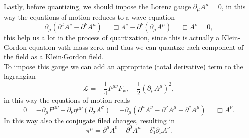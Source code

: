 Lastly, before quantizing, we should impose the Lorenz gauge $\partial_\mu A^\mu=0$, in this way the equations of motion reduces to a wave equation 
\begin{equation*}
    \partial_\mu(\partial^\mu A^\nu-\partial^\nu A^\mu)=\Box A^\nu-\partial^\nu(\partial_\mu A^\mu)=\Box A^\nu=0,
\end{equation*}
this help us a lot in the process of quantization, since this is actually a Klein-Gordon equation with mass zero, and thus we can quantize each component of the field as a Klein-Gordon field.\\
To impose this gauge we can add an appropriate (total derivative) term to the lagrangian
\begin{equation*}
    \mathcal{L}=-\frac{1}{4}F^{\mu\nu}F_{\mu\nu}-\frac{1}{2}(\partial_\mu A^\mu)^2,
\end{equation*} 
in this way the equations of motion reads\begin{equation*}
    0=-\partial_\mu F^{\mu\nu}-\partial_\nu\eta^{\mu\nu}(\partial_\sigma A^\sigma)=-\partial_\mu(\partial^\mu A^\nu-\partial^\nu A^\mu+\partial^\nu A^\mu)=\Box A^\nu.
\end{equation*}
In this way also the conjugate filed changes, resulting in
\begin{equation*}
    \pi^{\mu}=\partial^\mu A^0-\partial^0 A^\mu-\delta^\nu_0\partial_\nu A^\nu.
\end{equation*}

